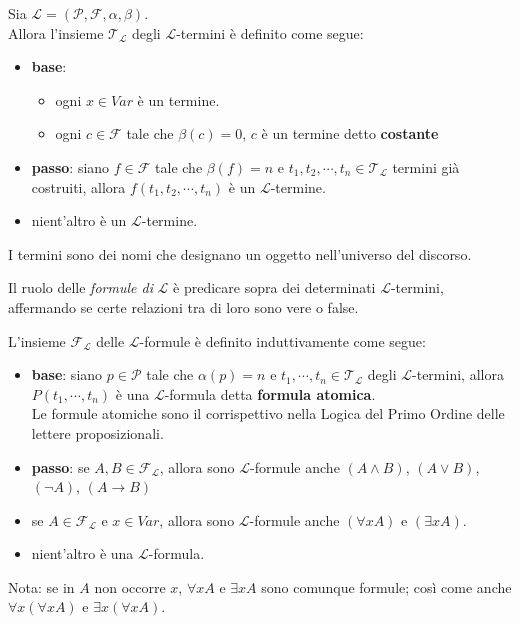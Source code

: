 \begin{defi}
  Sia $\mathscr{L} = (\mathscr{P}, \mathscr{F}, \alpha, \beta)$. \\
  Allora l'insieme $\mathscr{T_L}$ degli $\mathscr{L}$-termini è definito come segue:
  \begin{itemize}
    \item \textbf{base}:
      \begin{itemize}
        \item ogni $x \in Var$ è un termine. 
        \item ogni $c \in \mathscr{F}$ tale che $\beta(c) = 0$, $c$ è un termine detto \textbf{costante}
      \end{itemize}
    \item \textbf{passo}: siano $f \in \mathscr{F}$ tale che $\beta(f) = n$ e $t_1, t_2, \cdots, t_n \in \mathscr{T_L}$ termini già costruiti, allora $f(t_1, t_2, \cdots, t_n)$ è un $\mathscr{L}$-termine. 
    \item nient'altro è un $\mathscr{L}$-termine.
  \end{itemize}
  I termini sono dei nomi che designano un oggetto nell'universo del discorso.
\end{defi}

\begin{defi}[Formule]
Il ruolo delle \textit{formule di} $\mathscr{L}$ è predicare sopra dei determinati $\mathscr{L}$-termini, affermando se certe relazioni tra di loro sono vere o false.

L'insieme $\mathscr{F}_\mathscr{L}$ delle $\mathscr{L}$-formule è definito induttivamente come segue:
\begin{itemize}
  \item \textbf{base}: siano $p \in \mathscr{P}$ tale che $\alpha(p)=n$ e $t_1, \cdots, t_n \in \mathscr{T_L}$ degli $\mathscr{L}$-termini, allora $P(t_1, \cdots, t_n)$ è una $\mathscr{L}$-formula detta \textbf{formula atomica}. \\
  Le formule atomiche sono il corrispettivo nella Logica del Primo Ordine delle lettere proposizionali.
  \item \textbf{passo}: se $A,B \in \mathscr{F}_\mathscr{L}$, allora sono $\mathscr{L}$-formule anche $(A \land B)$, $(A \lor B)$, $(\neg A)$, $(A\rightarrow B)$
  \item se $A \in \mathscr{F}_\mathscr{L}$ e $x \in Var$, allora sono $\mathscr{L}$-formule anche $(\forall x A)$ e $(\exists x A)$.
  \item nient'altro è una $\mathscr{L}$-formula.
\end{itemize}
\end{defi}
Nota: se in $A$ non occorre $x$, $\forall x A$ e $\exists x A$ sono comunque formule; così come anche $\forall x (\forall x A)$ e $\exists x (\forall x A)$. 

